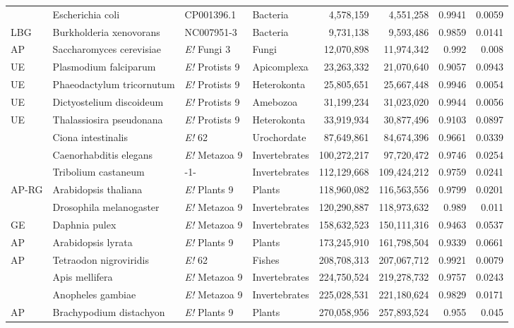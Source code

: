 \begin{FPtable}
{\begin{tabular}{ l l p{62pt} l r r r r }
 & Escherichia coli & CP001396.1 & Bacteria & 4,578,159 & 4,551,258 & 0.9941 & 0.0059 \\
LBG & Burkholderia xenovorans & NC007951-3 & Bacteria & 9,731,138 & 9,593,486 & 0.9859 & 0.0141 \\
AP & Saccharomyces cerevisiae & {\it E!} Fungi 3 & Fungi & 12,070,898 & 11,974,342 & 0.992 & 0.008 \\
UE & Plasmodium falciparum & {\it E!} Protists 9 & Apicomplexa & 23,263,332 & 21,070,640 & 0.9057 & 0.0943 \\
UE & Phaeodactylum tricornutum & {\it E!} Protists 9 & Heterokonta & 25,805,651 & 25,667,448 & 0.9946 & 0.0054 \\
UE & Dictyostelium discoideum & {\it E!} Protists 9 & Amebozoa & 31,199,234 & 31,023,020 & 0.9944 & 0.0056 \\
UE & Thalassiosira pseudonana & {\it E!} Protists 9 & Heterokonta & 33,919,934 & 30,877,496 & 0.9103 & 0.0897 \\
 & Ciona intestinalis & {\it E!} 62 & Urochordate & 87,649,861 & 84,674,396 & 0.9661 & 0.0339 \\
 & Caenorhabditis elegans & {\it E!} Metazoa 9 & Invertebrates & 100,272,217 & 97,720,472 & 0.9746 & 0.0254 \\
 & Tribolium castaneum & -1- & Invertebrates & 112,129,668 & 109,424,212 & 0.9759 & 0.0241 \\
AP-RG & Arabidopsis thaliana & {\it E!} Plants 9 & Plants & 118,960,082 & 116,563,556 & 0.9799 & 0.0201 \\
 & Drosophila melanogaster & {\it E!} Metazoa 9 & Invertebrates & 120,290,887 & 118,973,632 & 0.989 & 0.011 \\
GE & Daphnia pulex & {\it E!} Metazoa 9 & Invertebrates & 158,632,523 & 150,111,316 & 0.9463 & 0.0537 \\
AP & Arabidopsis lyrata & {\it E!} Plants 9 & Plants & 173,245,910 & 161,798,504 & 0.9339 & 0.0661 \\
AP & Tetraodon nigroviridis & {\it E!} 62 & Fishes & 208,708,313 & 207,067,712 & 0.9921 & 0.0079 \\
 & Apis mellifera & {\it E!} Metazoa 9 & Invertebrates & 224,750,524 & 219,278,732 & 0.9757 & 0.0243 \\
 & Anopheles gambiae & {\it E!} Metazoa 9 & Invertebrates & 225,028,531 & 221,180,624 & 0.9829 & 0.0171 \\
AP & Brachypodium distachyon & {\it E!} Plants 9 & Plants & 270,058,956 & 257,893,524 & 0.955 & 0.045 \\

\end{tabular}}
\end{FPtable}
